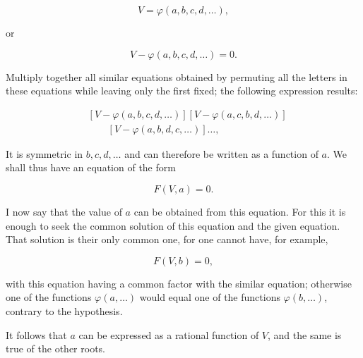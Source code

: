 \[
V=\varphi(a,b,c,d,\ldots),
\]

or

\[
V-\varphi(a,b,c,d,\ldots)=0.
\]

Multiply together all similar equations obtained by permuting all the letters
in these equations while leaving only the first fixed; the following
expression results:

\[
\begin{split}
&[V-\varphi(a,b,c,d,\ldots)]
[V-\varphi(a,c,b,d,\ldots)]\\
&\qquad [V-\varphi(a,b,d,c,\ldots)]\ldots,
\end{split}
\]

It is symmetric in $b,c,d,\ldots$ and can therefore be written as a function of
$a$. We shall thus have an equation of the form

\[
F(V,a)=0.
\]


I now say that the value of $a$ can be obtained from this equation. For this it
is enough to seek the common solution of this equation and the given equation.
That solution is their only common one, for one cannot have, for example,

\[
F(V,b)=0,
\]

with this equation having a common factor with the similar equation; otherwise
one of the functions $\varphi(a,\ldots)$ would equal one of the functions
$\varphi(b,\ldots)$, contrary to the hypothesis.

It follows that $a$ can be expressed as a rational function of $V$, and the
same is true of the other roots.



